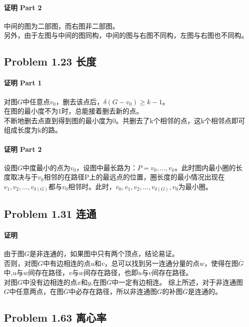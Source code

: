 \documentclass[17pt,UTF-8,a4paper]{ctexart}
\begin{document}
\paragraph*{证明 Part 2}
中间的图为二部图，而右图非二部图。\\
另外，由于左图与中间的图同构，中间的图与右图不同构，左图与右图也不同构。

\subsection*{Problem 1.23 长度} 
\paragraph*{证明 Part 1}
对图$G$中任意点$v_0$，删去该点后，$\delta({G-v_0})\geq{k-1}$。\\
在图的最小度不为1时，总能接着删去新的点。\\  
不断地删去点直到得到图的最小度为0。共删去了k个相邻的点，这k个相邻点即可组成长度为k的路。


\paragraph*{证明 Part 2}
设图$G$中度最小的点为$v_0$，设图中最长路为：$P=v_0,\dots,v_k$。此时图内最小圈的长度取决与于$v_0$相邻的在路径P上的最远点的位置，圈长度的最小情况出现在$v_1,v_2,\dots,v_{\delta(G)}$都与$v_0$相邻时。此时，$v_0,v_1,v_2,\dots,v_{\delta(G)},v_0$为最小圈。

\subsection*{Problem 1.31 连通}
\paragraph*{证明}
由于图$G$是非连通的，如果图中只有两个顶点，结论易证。\\
否则，对图$G$中有边相连的点$u$和$v$，总可以找到另一连通分量的点$w$，使得在图$\overline{G}$中,$u$与$w$间存在路径，$v$与$w$间存在路径，也即$u$与$v$间存在路径。\\
对图$G$中没有边相连的点$x$和$y$,在图$\overline{G}$中一定有边相连。
综上所述，对于非连通图$G$中任意两点，在图$\overline{G}$中必存在路径，所以非连通图$G$的补图$\overline{G}$是连通的。

\subsection*{Problem 1.63 离心率}
\end{document}
